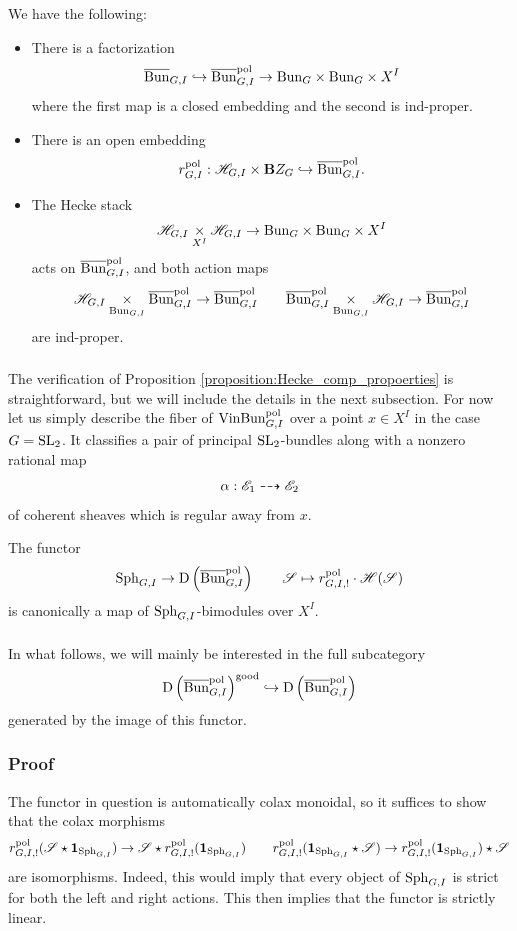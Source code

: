 \begin{proposition}
\label{proposition:Hecke_comp_propoerties}
We have the following:
\begin{itemize}
    \item[(i)] There is a factorization
      \[\overline{\mathrm{Bun}}_{G,I} \hookrightarrow \overline{\mathrm{Bun}}_{G,I}^{\mathrm{pol}} \to \mathrm{Bun}_G \times \mathrm{Bun}_G \times X^I\]
    where the first map is a closed embedding and the second is ind-proper.
    \item[(ii)] There is an open embedding
      \[r_{G,I}^{\mathrm{pol}} : \mathscr{H}_{G,I} \times \mathbf{B} Z_G \hookrightarrow \overline{\mathrm{Bun}}_{G,I}^{\mathrm{pol}}.\]
    \item[(iii)] The Hecke stack
      \[\mathscr{H}_{G,I} \underset{X^I}{\times} \mathscr{H}_{G,I} \to \mathrm{Bun}_G \times \mathrm{Bun}_G \times X^I\] 
    acts on $\overline{\mathrm{Bun}}_{G,I}^{\mathrm{pol}}$, and both action maps
      \[\mathscr{H}_{G,I} \underset{\mathrm{Bun}_{G,I}}{\times} \overline{\mathrm{Bun}}_{G,I}^{\mathrm{pol}} \to \overline{\mathrm{Bun}}_{G,I}^{\mathrm{pol}}  \qquad  \overline{\mathrm{Bun}}_{G,I}^{\mathrm{pol}} \underset{\mathrm{Bun}_{G,I}}{\times} \mathscr{H}_{G,I} \to \overline{\mathrm{Bun}}_{G,I}^{\mathrm{pol}}\]
    are ind-proper.
\end{itemize}
\end{proposition}

\subsubsection{} The verification of Proposition \ref{proposition:Hecke_comp_propoerties} is straightforward, but we will include the details in the next subsection. For now let us simply describe the fiber of $\mathrm{Vin}\mathrm{Bun}_{G,I}^{\mathrm{pol}}$ over a point $x \in X^I$ in the case $G = \mathrm{SL}_2$. It classifies a pair of principal $\mathrm{SL}_2$-bundles along with a nonzero rational map
    \[\alpha : \mathscr{E}_1 \dashrightarrow \mathscr{E}_2\]
of coherent sheaves which is regular away from $x$. 

\begin{proposition}
The functor
\[
    \mathrm{Sph}_{G,I} \to \mathrm{D}\left(\overline{\mathrm{Bun}}_{G,I}^{\mathrm{pol}} \right)
    \qquad \mathscr{S} \mapsto r_{G,I,!}^{\mathrm{pol}} \cdot \mathscr{H}(\mathscr{S})
\]
is canonically a map of $\mathrm{Sph}_{G,I}$-bimodules over $X^I$.
\end{proposition}

\subsubsection{} In what follows, we will mainly be interested in the full subcategory 
    \[\mathrm{D}\left(\overline{\mathrm{Bun}}_{G,I}^{\mathrm{pol}} \right)^{\mathrm{good}} \hookrightarrow \mathrm{D}\left(\overline{\mathrm{Bun}}_{G,I}^{\mathrm{pol}} \right)\]
generated by the image of this functor.

\subsubsection{Proof} The functor in question is automatically colax monoidal, so it suffices to show that the colax morphisms
  \[r_{G,I,!}^{\mathrm{pol}}(\mathscr{S} \star \mathbf{1}_{\mathrm{Sph}_{G,I}}) \to \mathscr{S} \star r_{G,I,!}^{\mathrm{pol}}(\mathbf{1}_{\mathrm{Sph}_{G,I}})  \qquad  r_{G,I,!}^{\mathrm{pol}}(\mathbf{1}_{\mathrm{Sph}_{G,I}} \star \mathscr{S}) \to r_{G,I,!}^{\mathrm{pol}}(\mathbf{1}_{\mathrm{Sph}_{G,I}}) \star \mathscr{S}\]
are isomorphisms. Indeed, this would imply that every object of $\mathrm{Sph}_{G,I}$ is strict for both the left and right actions. This then implies that the functor is strictly linear.

